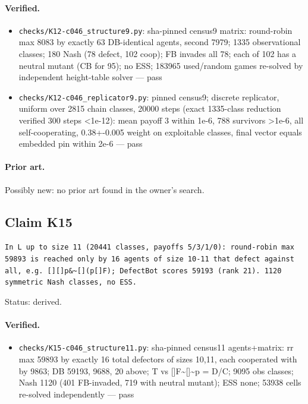 \documentclass{article}
\begin{document}
\paragraph{Verified.}
\begin{itemize}
\item \texttt{checks/K12-c046\_structure9.py}: sha-pinned census9 matrix: round-robin max 8083 by exactly 63 DB-identical agents, second 7979; 1335 observational classes; 180 Nash (78 defect, 102 coop); FB invades all 78; each of 102 has a neutral mutant (CB for 95); no ESS; 183965 used/random games re-solved by independent height-table solver --- pass
\item \texttt{checks/K12-c046\_replicator9.py}: pinned census9; discrete replicator, uniform over 2815 chain classes, 20000 steps (exact 1335-class reduction verified 300 steps \textless{}1e-12): mean payoff 3 within 1e-6, 788 survivors \textgreater{}1e-6, all self-cooperating, 0.38+-0.005 weight on exploitable classes, final vector equals embedded pin within 2e-6 --- pass
\end{itemize}

\paragraph{Prior art.} Possibly new: no prior art found in the owner's search.

\subsection*{Claim K15}

\texttt{In L up to size 11 (20441 classes, payoffs 5/3/1/0): round-robin max 59893 is reached only by 16 agents of size 10-11 that defect against all, e.g. [][]p\&\textasciitilde{}[](p\textbar{}[]F); DefectBot scores 59193 (rank 21). 1120 symmetric Nash classes, no ESS.}

Status: derived.

\paragraph{Verified.}
\begin{itemize}
\item \texttt{checks/K15-c046\_structure11.py}: sha-pinned census11 agents+matrix: rr max 59893 by exactly 16 total defectors of sizes 10,11, each cooperated with by 9863; DB 59193, 9688, 20 above; T vs []F\textbar{}\textasciitilde{}[]\textasciitilde{}p = D/C; 9095 obs classes; Nash 1120 (401 FB-invaded, 719 with neutral mutant); ESS none; 53938 cells re-solved independently --- pass
\end{itemize}
\end{document}
